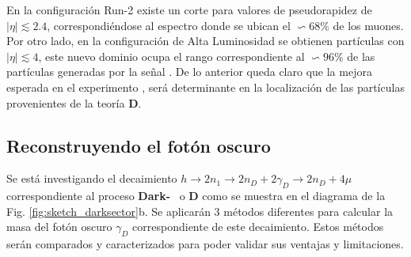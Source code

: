 En la configuración  Run-2 existe un corte para valores de pseudorapidez de $|\eta|\lesssim 2.4$, correspondiéndose al espectro donde se ubican el $\backsim 68\%$ de los muones. Por otro lado, en la configuración de Alta Luminosidad se obtienen partículas con $|\eta|\lesssim 4$, este nuevo dominio ocupa el rango correspondiente al $\backsim 96\%$ de las partículas generadas por la señal \MC. De lo anterior queda claro que la mejora esperada en el experimento \CMS, será determinante en la localización de las partículas provenientes de la teoría \MSSM\textbf{D}.



\subsection{Reconstruyendo el fotón oscuro}
Se está investigando el decaimiento $h \rightarrow 2n_1 \rightarrow 2n_D + 2\gamma_D \rightarrow 2n_D + 4\mu$ correspondiente al proceso \textbf{Dark-}\SUSY ~ o \MSSM\textbf{D} como se muestra en el diagrama de la Fig. \ref{fig:sketch_darksector}b. Se aplicarán 3 métodos diferentes para calcular la masa del fotón oscuro $\gamma_D$ correspondiente de este decaimiento. Estos métodos serán comparados y caracterizados para poder validar sus ventajas y limitaciones.



